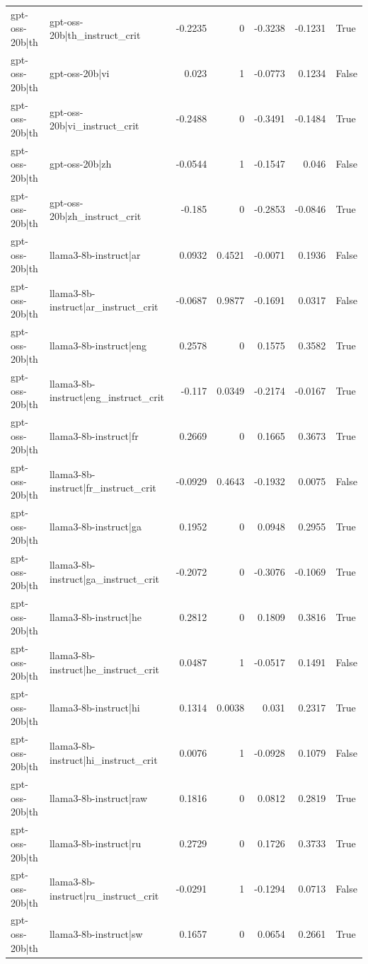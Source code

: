\begin{table}
\begin{tabular}{l l r r r r l}
gpt-oss-20b|th & gpt-oss-20b|th_instruct_crit & -0.2235 & 0 & -0.3238 & -0.1231 & True \\
gpt-oss-20b|th & gpt-oss-20b|vi & 0.023 & 1 & -0.0773 & 0.1234 & False \\
gpt-oss-20b|th & gpt-oss-20b|vi_instruct_crit & -0.2488 & 0 & -0.3491 & -0.1484 & True \\
gpt-oss-20b|th & gpt-oss-20b|zh & -0.0544 & 1 & -0.1547 & 0.046 & False \\
gpt-oss-20b|th & gpt-oss-20b|zh_instruct_crit & -0.185 & 0 & -0.2853 & -0.0846 & True \\
gpt-oss-20b|th & llama3-8b-instruct|ar & 0.0932 & 0.4521 & -0.0071 & 0.1936 & False \\
gpt-oss-20b|th & llama3-8b-instruct|ar_instruct_crit & -0.0687 & 0.9877 & -0.1691 & 0.0317 & False \\
gpt-oss-20b|th & llama3-8b-instruct|eng & 0.2578 & 0 & 0.1575 & 0.3582 & True \\
gpt-oss-20b|th & llama3-8b-instruct|eng_instruct_crit & -0.117 & 0.0349 & -0.2174 & -0.0167 & True \\
gpt-oss-20b|th & llama3-8b-instruct|fr & 0.2669 & 0 & 0.1665 & 0.3673 & True \\
gpt-oss-20b|th & llama3-8b-instruct|fr_instruct_crit & -0.0929 & 0.4643 & -0.1932 & 0.0075 & False \\
gpt-oss-20b|th & llama3-8b-instruct|ga & 0.1952 & 0 & 0.0948 & 0.2955 & True \\
gpt-oss-20b|th & llama3-8b-instruct|ga_instruct_crit & -0.2072 & 0 & -0.3076 & -0.1069 & True \\
gpt-oss-20b|th & llama3-8b-instruct|he & 0.2812 & 0 & 0.1809 & 0.3816 & True \\
gpt-oss-20b|th & llama3-8b-instruct|he_instruct_crit & 0.0487 & 1 & -0.0517 & 0.1491 & False \\
gpt-oss-20b|th & llama3-8b-instruct|hi & 0.1314 & 0.0038 & 0.031 & 0.2317 & True \\
gpt-oss-20b|th & llama3-8b-instruct|hi_instruct_crit & 0.0076 & 1 & -0.0928 & 0.1079 & False \\
gpt-oss-20b|th & llama3-8b-instruct|raw & 0.1816 & 0 & 0.0812 & 0.2819 & True \\
gpt-oss-20b|th & llama3-8b-instruct|ru & 0.2729 & 0 & 0.1726 & 0.3733 & True \\
gpt-oss-20b|th & llama3-8b-instruct|ru_instruct_crit & -0.0291 & 1 & -0.1294 & 0.0713 & False \\
gpt-oss-20b|th & llama3-8b-instruct|sw & 0.1657 & 0 & 0.0654 & 0.2661 & True \\

\end{tabular}
\end{table}
